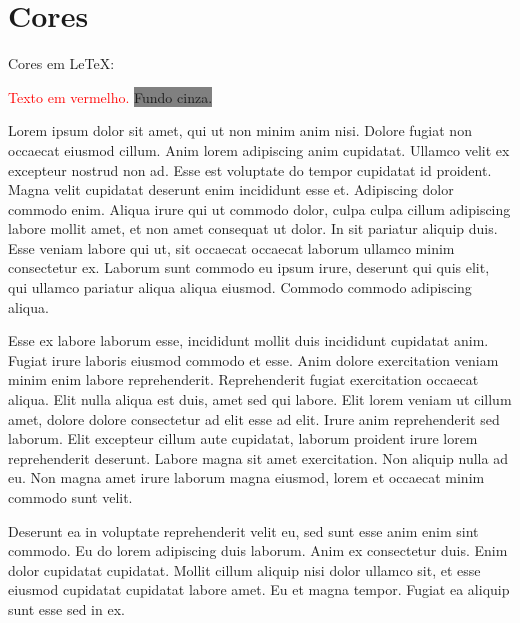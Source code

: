 \documentclass{article}
\begin{document}
\section{Cores}

Cores em LeTeX:

\textcolor{red}{Texto em vermelho.} %
\colorbox{gray}{Fundo cinza.} %
\pagecolor{yellow} %

Lorem ipsum dolor sit amet, qui ut non minim anim nisi. Dolore fugiat
non occaecat eiusmod cillum.
Anim lorem adipiscing anim cupidatat. Ullamco velit ex excepteur
nostrud non ad. Esse est voluptate do tempor cupidatat id proident.
Magna velit cupidatat deserunt enim incididunt esse et. Adipiscing
dolor commodo enim.
Aliqua irure qui ut commodo dolor, culpa culpa cillum adipiscing
labore mollit amet, et non amet consequat ut dolor.
In sit pariatur aliquip duis. Esse veniam labore qui ut, sit occaecat
occaecat laborum ullamco minim consectetur ex.
Laborum sunt commodo eu ipsum irure, deserunt qui quis elit, qui
ullamco pariatur aliqua aliqua eiusmod. Commodo commodo adipiscing aliqua.

Esse ex labore laborum esse, incididunt mollit duis incididunt
cupidatat anim. Fugiat irure laboris eiusmod commodo et esse. Anim
dolore exercitation veniam minim enim labore reprehenderit.
Reprehenderit fugiat exercitation occaecat aliqua. Elit nulla aliqua
est duis, amet sed qui labore.
Elit lorem veniam ut cillum amet, dolore dolore consectetur ad elit
esse ad elit. Irure anim reprehenderit sed laborum.
Elit excepteur cillum aute cupidatat, laborum proident irure lorem
reprehenderit deserunt. Labore magna sit amet exercitation.
Non aliquip nulla ad eu. Non magna amet irure laborum magna eiusmod,
lorem et occaecat minim commodo sunt velit.

Deserunt ea in voluptate reprehenderit velit eu, sed sunt esse anim
enim sint commodo.
Eu do lorem adipiscing duis laborum. Anim ex consectetur duis. Enim
dolor cupidatat cupidatat.
Mollit cillum aliquip nisi dolor ullamco sit, et esse eiusmod
cupidatat cupidatat labore amet. Eu et magna tempor.
Fugiat ea aliquip sunt esse sed in ex.
\end{document}
